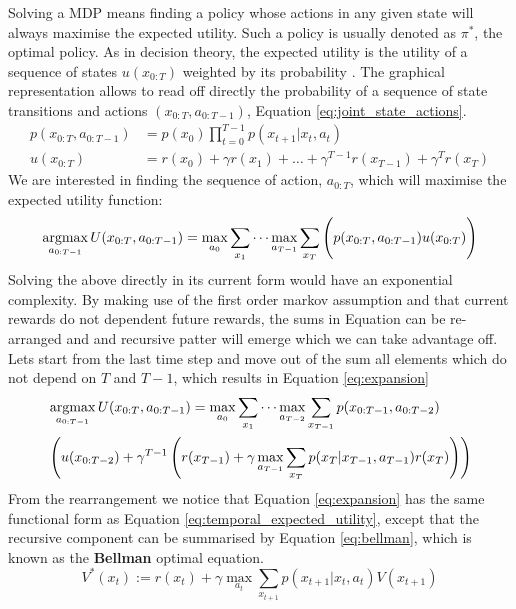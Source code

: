 Solving a MDP means finding a policy whose actions in any given state will always maximise the expected utility. Such 
a policy is usually denoted as $\pi^*$, the optimal policy. As in decision theory, the expected utility is the utility 
of  a sequence of states $u(x_{0:T})$ weighted by its probability . The graphical representation allows to read off directly the probability 
of a sequence of state transitions and actions $(x_{0:T},a_{0:T-1})$, Equation \ref{eq:joint_state_actions}.
\begin{align}\label{eq:joint_state_actions}
  p(x_{0:T},a_{0:T-1}) &= p(x_{0}) \prod_{t=0}^{T-1} p(x_{t+1}|x_t,a_t) \\
  u(x_{0:T}) 	       &= r(x_0) + \gamma r(x_1) + \dots + \gamma^{T-1} r(x_{T-1})  + \gamma^T r(x_T)
\end{align}
We are interested in finding the sequence of action, $a_{0:T}$, which will maximise the expected utility function:
\begin{equation}\label{eq:temporal_expected_utility}
 \argmax_{a_{0:T-1}} U(x_{0:T},a_{0:T-1}) = \max_{a_0} \sum\limits_{x_1}   \cdots  \max_{a_{T-1}} \sum\limits_{x_T} \Bigg( p(x_{0:T},a_{0:T-1}) u(x_{0:T}) \Bigg)
\end{equation}
Solving the above directly in its current form would have an exponential complexity. By making use of the first order 
markov assumption and that current rewards do not dependent future rewards, the sums in Equation \label{eq:max_util} can be re-arranged and 
and recursive patter will emerge which we can take advantage off. Lets start from the last time step and move out of the sum all elements 
which do not depend on $T$ and $T-1$, which results in Equation \ref{eq:expansion}
\begin{align}\label{eq:expansion}
 &\argmax_{a_{0:T-1}} U(x_{0:T},a_{0:T-1}) =\max_{a_0} \sum\limits_{x_1}   \cdots  \max_{a_{T-2}} \sum\limits_{x_{T-1}} p(x_{0:T-1},a_{0:T-2})  \nonumber\\
 &\left( u(x_{0:T-2}) + \gamma^{T-1} \left( r(x_{T-1}) +  \gamma \max_{a_{T-1}} \sum\limits_{x_{T}} p(x_{T}|x_{T-1},a_{T-1}) r(x_{T}) \right) \right)
\end{align}
From the rearrangement we notice that Equation \ref{eq:expansion} has the same functional form as Equation \ref{eq:temporal_expected_utility}, 
except that the recursive component can be summarised by Equation \ref{eq:bellman}, which is known as 
the \textbf{Bellman} optimal equation.
\begin{equation}\label{eq:bellman}
 V^*(x_t) := r(x_t) + \gamma \max_{a_t} \sum\limits_{x_{t+1}} p(x_{t+1}|x_t,a_t) V(x_{t+1})
\end{equation}
